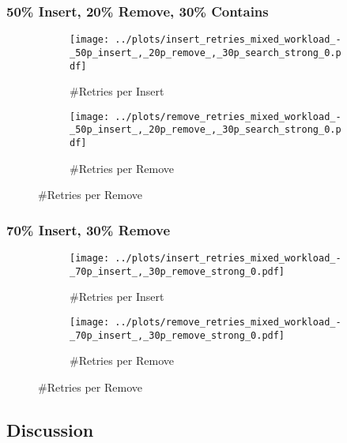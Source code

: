 \subsubsection*{50\% Insert, 20\% Remove, 30\% Contains}

\begin{figure}[H]
    \centering
    \begin{subfigure}[b]{0.49\textwidth}
        \texttt{[image: ../plots/insert\_retries\_mixed\_workload\_-\_50p\_insert\_,\_20p\_remove\_,\_30p\_search\_strong\_0.pdf]}
        \caption{\#Retries per Insert}
        \label{fig:insert_retries_mixed_workload_:1}
    \end{subfigure}
    \begin{subfigure}[b]{0.49\textwidth}
        \texttt{[image: ../plots/remove\_retries\_mixed\_workload\_-\_50p\_insert\_,\_20p\_remove\_,\_30p\_search\_strong\_0.pdf]}
        \caption{\#Retries per Remove}
    \end{subfigure}
\end{figure}

\subsubsection*{70\% Insert, 30\% Remove}

\begin{figure}[H]
    \centering
    \begin{subfigure}[b]{0.49\textwidth}
        \texttt{[image: ../plots/insert\_retries\_mixed\_workload\_-\_70p\_insert\_,\_30p\_remove\_strong\_0.pdf]}
        \caption{\#Retries per Insert}
        \label{fig:insert_retries_mixed_workload_:2}
    \end{subfigure}
       \begin{subfigure}[b]{0.49\textwidth}
        \texttt{[image: ../plots/remove\_retries\_mixed\_workload\_-\_70p\_insert\_,\_30p\_remove\_strong\_0.pdf]}
        \caption{\#Retries per Remove}
    \end{subfigure}
\end{figure}


\subsection{Discussion}


